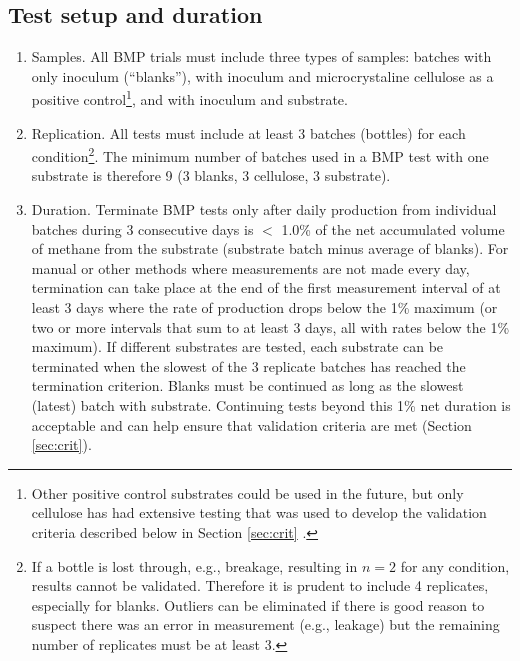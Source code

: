 \documentclass[]{article}
\begin{document}
\subsection{Test setup and duration}
\label{sec:setup}
\begin{enumerate}
  \item Samples. 
    All BMP trials must include three types of samples: batches with only inoculum (``blanks''), with inoculum and microcrystaline cellulose as a positive control\footnote{
      Other positive control substrates could be used in the future, but only cellulose has had extensive testing that was used to develop the validation criteria described below in Section \ref{sec:crit} \citep{hafnerImprovingInterlaboratoryReproducibility2020}.
    }, and with inoculum and substrate.
    \item Replication. 
    All tests must include at least 3 batches (bottles) for each condition\footnote{
      If a bottle is lost through, e.g., breakage, resulting in $n=2$ for any condition, results cannot be validated.
      Therefore it is prudent to include 4 replicates, especially for blanks.
      Outliers can be eliminated if there is good reason to suspect there was an error in measurement (e.g., leakage) but the remaining number of replicates must be at least 3.
    }.
    The minimum number of batches used in a BMP test with one substrate is therefore 9 (3 blanks, 3 cellulose, 3 substrate).
  \item Duration. 
    Terminate BMP tests only after daily  production from individual batches during 3 consecutive days is $<$ 1.0\% of the net accumulated volume of methane from the substrate (substrate batch minus average of blanks). 
    For manual or other methods where measurements are not made every day, termination can take place at the end of the first measurement interval of at least 3 days where the rate of production drops below the 1\% maximum (or two or more intervals that sum to at least 3 days, all with rates below the 1\% maximum).
    If different substrates are tested, each substrate can be terminated when the slowest of the 3 replicate batches has reached the termination criterion.
    Blanks must be continued as long as the slowest (latest) batch with substrate.
    Continuing tests beyond this 1\% net duration is acceptable and can help ensure that validation criteria are met (Section \ref{sec:crit}).
\end{enumerate}
\end{document}
